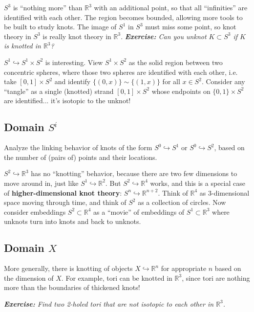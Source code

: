 \documentclass[11pt]{article}
\newcommand{\R}{\mathbb{R}}
\theoremstyle{plain}
\theoremstyle{definition}
\begin{document}
$S^3$ is ``nothing more'' than $\R^3$ with an additional point, so that all ``infinities'' are identified with each other. The region becomes bounded, allowing more tools to be built to study knots. The image of $S^1$ in $S^3$ must miss some point, so knot theory in $S^3$ is really knot theory in $\R^3$. \textit{\textbf{Exercise:} Can you unknot $K\subset S^3$ if $K$ is knotted in $\R^3$?}

\bigskip
$S^1\hookrightarrow S^1\times S^2$ is interesting. View $S^1\times S^2$ as the solid region between two concentric spheres, where those two spheres are identified with each other, i.e. take $[0,1]\times S^2$ and identify $\lbrace(0,x)\rbrace\sim\lbrace(1,x)\rbrace$ for all $x\in S^2$. Consider any ``tangle'' as a single (knotted) strand $[0,1]\times S^2$ whose endpoints on $\lbrace0,1\rbrace\times S^2$ are identified... it's isotopic to the unknot!




\subsection{Domain $S^i$}

Analyze the linking behavior of knots of the form $S^0\hookrightarrow S^1$ or $S^0\hookrightarrow S^2$, based on the number of (pairs of) points and their locations.

\bigskip
$S^2\hookrightarrow\R^3$ has no ``knotting'' behavior, because there are two few dimensions to move around in, just like $S^1\hookrightarrow\R^2$. But $S^2\hookrightarrow\R^4$ works, and this is a special case of \textbf{higher-dimensional knot theory}: $S^n\hookrightarrow\R^{n+2}$. Think of $\R^4$ as 3-dimensional space moving through time, and think of $S^2$ as a collection of circles. Now consider embeddings $S^2\subset\R^4$ as a ``movie'' of embeddings of $S^1\subset\R^3$ where unknots turn into knots and back to unknots.


\subsection{Domain $X$}

More generally, there is knotting of objects $X\hookrightarrow\R^n$ for appropriate $n$ based on the dimension of $X$. For example, tori can be knotted in $\R^3$, since tori are nothing more than the boundaries of thickened knots!

\textit{\textbf{Exercise:} Find two 2-holed tori that are not isotopic to each other in $\R^3$.}
\end{document}
